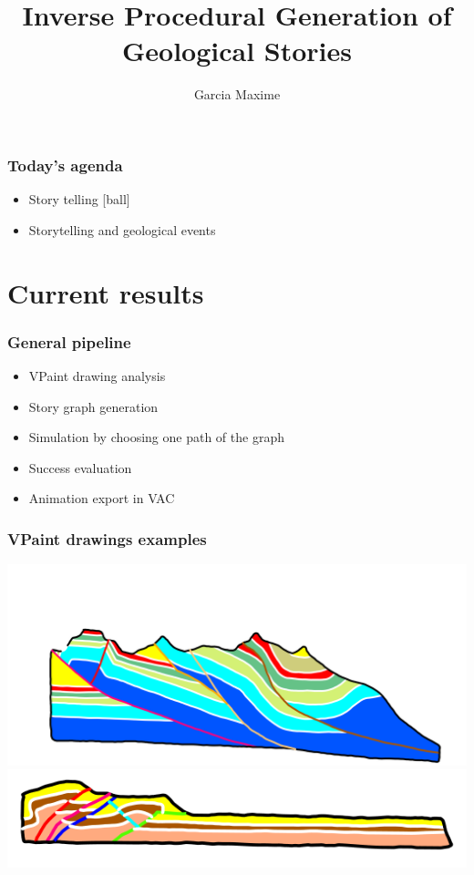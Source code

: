 \documentclass{beamer}
\title[Monthly Meeting: June]{Inverse Procedural Generation of Geological Stories}
\author{Garcia Maxime}
\begin{document}
	
    \begin{frame}[label=(intro)]
	\titlepage
    \end{frame}
	
	
	\begin{frame}
	\frametitle{Today's agenda}
	\begin{itemize}
	[ball]
	\item Story telling
	[ball]
	\item Storytelling and geological events 
	\end{itemize}
	\end{frame}
	
	
	\section{Current results}
	
	\begin{frame}
	\frametitle{General pipeline}
    \begin{itemize}
    \item VPaint drawing analysis
    \item Story graph generation
    \item Simulation by choosing one path of the graph
    \item Success evaluation
    \item Animation export in VAC
    \end{itemize}
    \end{frame}
    
    
	\begin{frame}
	\frametitle{VPaint drawings examples}
	\begin{center}
	\includegraphics[scale=0.25]{chartreuse.png}\\
	\includegraphics[scale=0.45]{bas1.png}
	\end{center}
	\end{frame}
	
\end{document}
